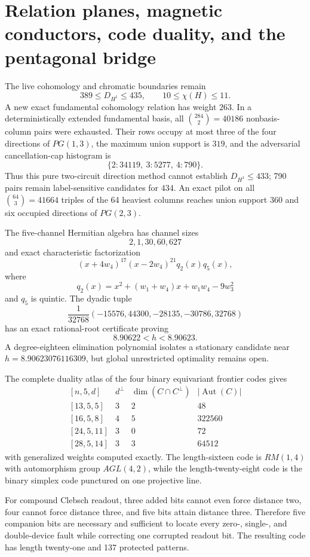 \section{Relation planes, magnetic conductors, code duality, and the pentagonal bridge}
\label{sec:bt3556-3569}

The live cohomology and chromatic boundaries remain
\[
389\le D_{H^1}\le435,
\qquad
10\le\chi(H)\le11.
\]
A new exact fundamental cohomology relation has weight $263$.  In a
deterministically extended fundamental basis, all $\binom{284}{2}=40186$
nonbasis-column pairs were exhausted.  Their rows occupy at most three of the
four directions of $PG(1,3)$, the maximum union support is $319$, and the
adversarial cancellation-cap histogram is
\[
\{2:34119,\ 3:5277,\ 4:790\}.
\]
Thus this pure two-circuit direction method cannot establish
$D_{H^1}\le433$; 790 pairs remain label-sensitive candidates for 434.  An
exact pilot on all $\binom{64}{3}=41664$ triples of the 64 heaviest columns
reaches union support $360$ and six occupied directions of $PG(2,3)$.

The five-channel Hermitian algebra has channel sizes
\[
2,1,30,60,627
\]
and exact characteristic factorization
\[
(x+4w_4)^{17}(x-2w_4)^{21}q_2(x)q_5(x),
\]
where
\[
q_2(x)=x^2+(w_1+w_4)x+w_1w_4-9w_3^2
\]
and $q_5$ is quintic.  The dyadic tuple
\[
\frac1{32768}(-15576,44300,-28135,-30786,32768)
\]
has an exact rational-root certificate proving
\[
8.90622<h<8.90623.
\]
A degree-eighteen elimination polynomial isolates a stationary candidate near
$h=8.90623076116309$, but global unrestricted optimality remains open.

The complete duality atlas of the four binary equivariant frontier codes gives
\[
\begin{array}{c|c|c|c}
[n,5,d]&d^\perp&\dim(C\cap C^\perp)&|\operatorname{Aut}(C)|\\ \hline
{[13,5,5]}&3&2&48\\
{[16,5,8]}&4&5&322560\\
{[24,5,11]}&3&0&72\\
{[28,5,14]}&3&3&64512
\end{array}
\]
with generalized weights computed exactly.  The length-sixteen code is
$RM(1,4)$ with automorphism group $AGL(4,2)$, while the length-twenty-eight
code is the binary simplex code punctured on one projective line.

For compound Clebsch readout, three added bits cannot even force distance two,
four cannot force distance three, and five bits attain distance three.
Therefore five companion bits are necessary and sufficient to locate every
zero-, single-, and double-device fault while correcting one corrupted readout
bit.  The resulting code has length twenty-one and 137 protected patterns.

